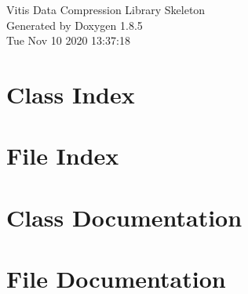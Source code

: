 \documentclass[twoside]{book}
\newcommand{\clearemptydoublepage}{%
  \newpage{\pagestyle{empty}\cleardoublepage}%
}
\begin{document}
\hypersetup{pageanchor=false}
\begin{titlepage}
\vspace*{7cm}
\begin{center}%
{\Large Vitis Data Compression Library Skeleton }\\
\vspace*{1cm}
{\large Generated by Doxygen 1.8.5}\\
\vspace*{0.5cm}
{\small Tue Nov 10 2020 13:37:18}\\
\end{center}
\end{titlepage}
\clearemptydoublepage
\tableofcontents
\clearemptydoublepage
{}
\hypersetup{pageanchor=true}

\chapter{Class Index}

\chapter{File Index}

\chapter{Class Documentation}






\chapter{File Documentation}


























\newpage
{}
{}
\printindex
\end{document}
